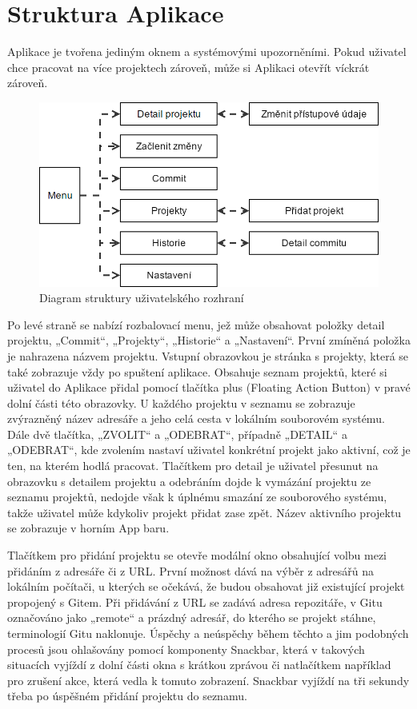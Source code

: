 \section{Struktura Aplikace}

Aplikace je tvořena jediným oknem a systémovými upozorněními. Pokud uživatel chce pracovat na více projektech zároveň, může si Aplikaci otevřít víckrát zároveň.


\begin{figure}[ht]
	\centering
	\includegraphics[width=\textwidth]{sections/ui/images/flow.png}
	\caption{Diagram struktury uživatelského rozhraní}
\end{figure}

Po levé straně se nabízí rozbalovací menu, jež může obsahovat položky detail projektu, „Commit“, „Projekty“, „Historie“ a „Nastavení“. První zmíněná položka je nahrazena názvem projektu. Vstupní obrazovkou je stránka s projekty, která se také zobrazuje vždy po spuštení aplikace. Obsahuje seznam projektů, které si uživatel do Aplikace přidal pomocí tlačítka plus (Floating Action Button) v pravé dolní části této obrazovky. U každého projektu v seznamu se zobrazuje zvýrazněný název adresáře a jeho celá cesta v lokálním souborovém systému. Dále dvě tlačítka, „ZVOLIT“ a „ODEBRAT“, případně „DETAIL“ a „ODEBRAT“, kde zvolením nastaví uživatel konkrétní projekt jako aktivní, což je ten, na kterém hodlá pracovat. Tlačítkem pro detail je uživatel přesunut na obrazovku s detailem projektu a odebráním dojde k vymázání projektu ze seznamu projektů, nedojde však k úplnému smazání ze souborového systému, takže uživatel může kdykoliv projekt přidat zase zpět. Název aktivního projektu se zobrazuje v horním App baru.

Tlačítkem pro přidání projektu se otevře modální okno obsahující volbu mezi přidáním z adresáře či z URL. První možnost dává na výběr z adresářů na lokálním počítači, u kterých se očekává, že budou obsahovat již existující projekt propojený s Gitem. Při přidávání z URL se zadává adresa repozitáře, v Gitu označováno jako „remote“ a prázdný adresář, do kterého se projekt stáhne, terminologií Gitu naklonuje. Úspěchy a neúspěchy během těchto a jim podobných procesů jsou ohlašovány pomocí komponenty Snackbar, která v takových situacích vyjíždí z dolní části okna s krátkou zprávou či natlačítkem například pro zrušení akce, která vedla k tomuto zobrazení. Snackbar vyjíždí na tři sekundy třeba po úspěšném přidání projektu do seznamu.

